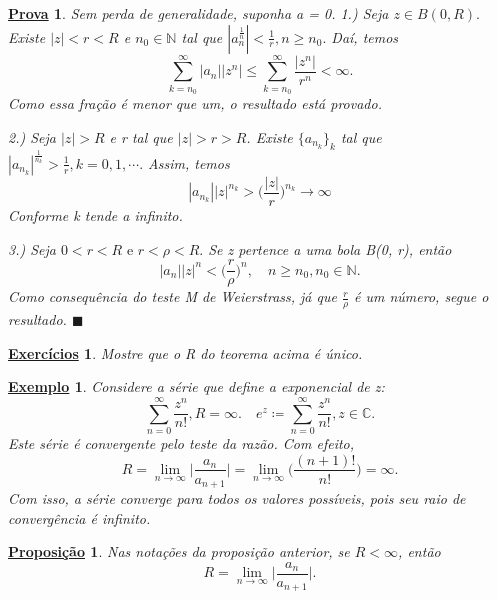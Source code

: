 \documentclass{article}
\newtheorem{example}{\underline{Exemplo}}[section]
\newtheorem*{proof*}{\underline{Prova}}
\newtheorem*{prop*}{\underline{Proposi\c c\~ao}}
\newtheorem*{exer*}{\underline{Exerc\'icios}}
\renewcommand\qedsymbol{$\blacksquare$}
\begin{document}
  \begin{proof*}
    Sem perda de generalidade, suponha a = 0.
    1.) Seja $z\in{B(0, R)}.$ Existe $|z| < r < R$ e $n_0\in\mathbb{N}$ tal que $|a_n^{\frac{1}{n}}| < \frac{1}{r},
    n\geq{n_0}.$ Da\'i, temos 
    $$
    \sum_{k=n_0}^{\infty}|a_n||z^n|\leq \sum_{k=n_0}^{\infty}\frac{|z^n|}{r^n} < \infty.
    $$
    Como essa fra\c c\~ao \'e menor que um, o resultado est\'a provado.

    2.) Seja $|z| > R$ e r tal que $|z|> r > R$. Existe $\{a_{n_k}\}_k$ tal que $|a_{n_k}|^{\frac{1}{n_k}} > \frac{1}{r},
    k = 0, 1, \cdots.$ Assim, temos
    $$
    |a_{n_k}||z|^{n_k} > \biggl(\frac{|z|}{r}\biggr)^{n_k}\to\infty
    $$
    Conforme k tende a infinito.

    3.) Seja $0 < r < R \text{ e } r < \rho < R.$ Se z pertence a uma bola B(0, r), ent\~ao
    $$
    |a_n||z|^n < \biggl(\frac{r}{\rho}\biggr)^n, \quad n\geq{n_0}, n_0\in\mathbb{N}.
    $$
    Como consequ\^encia do teste M de Weierstrass, j\'a que $\frac{r}{\rho}$ \'e um n\'umero, segue
    o resultado.
    \qedsymbol
  \end{proof*}
  \begin{exer*}
    Mostre que o R do teorema acima \'e \'unico.
  \end{exer*}
  \begin{example}
    Considere a s\'erie que define a exponencial de z:
    $$
    \sum_{n=0}^{\infty}\frac{z^n}{n!}, R = \infty.\quad e^z\coloneqq \sum_{n=0}^{\infty}\frac{z^n}{n!}, z\in\mathbb{C}.
    $$
    Este s\'erie \'e convergente pelo teste da raz\~ao. Com efeito, 
    $$
    R = \lim_{n\to\infty}\biggl|\frac{a_n}{a_{n+1}}\biggr| = \lim_{n\to\infty}\biggl(\frac{(n+1)!}{n!}\biggr) = \infty.
    $$
    Com isso, a s\'erie converge para todos os valores poss\'iveis, pois seu raio de converg\^encia
    \'e infinito.
  \end{example}
  \begin{prop*}
    Nas nota\c c\~oes da proposi\c c\~ao anterior, se $R < \infty$, ent\~ao
    $$
    R = \lim_{n\to\infty}\biggl|\frac{a_n}{a_{n+1}}\biggr|.
    $$
  \end{prop*}
\end{document}
